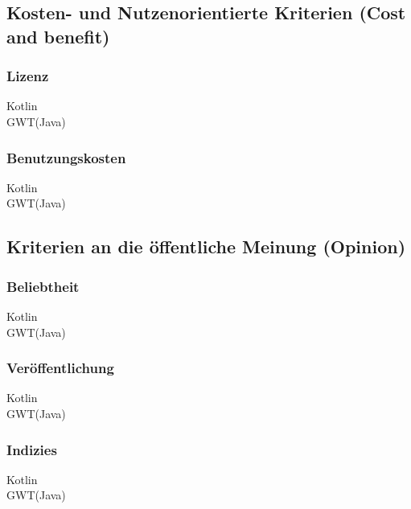 \subsection{Kosten- und Nutzenorientierte Kriterien (Cost and benefit)}
\subsubsection{Lizenz}
\begin{description}
	\item[Kotlin] 
	\item[GWT(Java)] 
\end{description}

\subsubsection{Benutzungskosten}
\begin{description}
	\item[Kotlin] 
	\item[GWT(Java)] 
\end{description}


\subsection{Kriterien an die öffentliche Meinung (Opinion)}
\subsubsection{Beliebtheit}
\begin{description}
	\item[Kotlin] 
	\item[GWT(Java)] 
\end{description}

\subsubsection{Veröffentlichung}
\begin{description}
	\item[Kotlin] 
	\item[GWT(Java)] 
\end{description}

\subsubsection{Indizies}
\begin{description}
	\item[Kotlin] 
	\item[GWT(Java)] 
\end{description}


